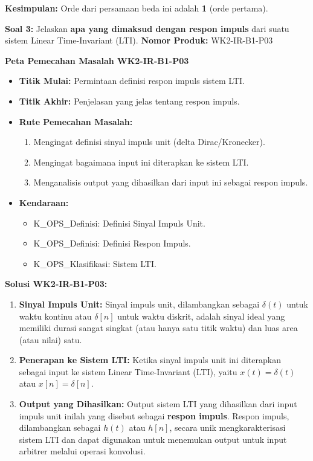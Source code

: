 \documentclass[
  letterpaper,
  DIV=11,
  numbers=noendperiod]{scrreprt}
\providecommand{\tightlist}{%
  \setlength{\itemsep}{0pt}\setlength{\parskip}{0pt}}
\begin{document}
\textbf{Kesimpulan:} Orde dari persamaan beda ini adalah \textbf{1}
(orde pertama).

\textbf{Soal 3:} Jelaskan \textbf{apa yang dimaksud dengan respon
impuls} dari suatu sistem Linear Time-Invariant (LTI). \textbf{Nomor
Produk:} WK2-IR-B1-P03

\textbf{Peta Pemecahan Masalah WK2-IR-B1-P03}

\begin{itemize}
\tightlist
\item
  \textbf{Titik Mulai:} Permintaan definisi respon impuls sistem LTI.
\item
  \textbf{Titik Akhir:} Penjelasan yang jelas tentang respon impuls.
\item
  \textbf{Rute Pemecahan Masalah:}

  \begin{enumerate}
  \def\labelenumi{\arabic{enumi}.}
  \tightlist
  \item
    Mengingat definisi sinyal impuls unit (delta Dirac/Kronecker).
  \item
    Mengingat bagaimana input ini diterapkan ke sistem LTI.
  \item
    Menganalisis output yang dihasilkan dari input ini sebagai respon
    impuls.
  \end{enumerate}
\item
  \textbf{Kendaraan:}

  \begin{itemize}
  \tightlist
  \item
    K\_OPS\_Definisi: Definisi Sinyal Impuls Unit.
  \item
    K\_OPS\_Definisi: Definisi Respon Impuls.
  \item
    K\_OPS\_Klasifikasi: Sistem LTI.
  \end{itemize}
\end{itemize}

\textbf{Solusi WK2-IR-B1-P03:}

\begin{enumerate}
\def\labelenumi{\arabic{enumi}.}
\tightlist
\item
  \textbf{Sinyal Impuls Unit:} Sinyal impuls unit, dilambangkan sebagai
  \(\delta(t)\) untuk waktu kontinu atau \(\delta[n]\) untuk waktu
  diskrit, adalah sinyal ideal yang memiliki durasi sangat singkat (atau
  hanya satu titik waktu) dan luas area (atau nilai) satu.
\item
  \textbf{Penerapan ke Sistem LTI:} Ketika sinyal impuls unit ini
  diterapkan sebagai input ke sistem Linear Time-Invariant (LTI), yaitu
  \(x(t) = \delta(t)\) atau \(x[n] = \delta[n]\).
\item
  \textbf{Output yang Dihasilkan:} Output sistem LTI yang dihasilkan
  dari input impuls unit inilah yang disebut sebagai \textbf{respon
  impuls}. Respon impuls, dilambangkan sebagai \(h(t)\) atau \(h[n]\),
  secara unik mengkarakterisasi sistem LTI dan dapat digunakan untuk
  menemukan output untuk input arbitrer melalui operasi konvolusi.
\end{enumerate}
\end{document}
